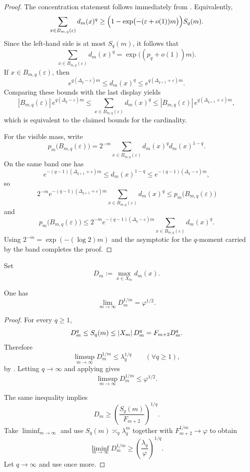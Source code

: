 \begin{proof}
The concentration statement follows immediately from
.  Equivalently,
\[
  \sum_{x\in B_{m,q}(\varepsilon)} d_m(x)^q
  \ge
  \Bigl(1-\exp\bigl(-(\varepsilon+o(1))m\bigr)\Bigr)S_q(m).
\]
Since the left-hand side is at most \(S_q(m)\), it follows that
\[
  \sum_{x\in B_{m,q}(\varepsilon)} d_m(x)^q
  =
  \exp\bigl((p_q+o(1))m\bigr).
\]
If \(x\in B_{m,q}(\varepsilon)\), then
\[
  e^{q(\Delta_q-\varepsilon)m}\le d_m(x)^q\le e^{q(\Delta_{q+1}+\varepsilon)m}.
\]
Comparing these bounds with the last display yields
\[
  |B_{m,q}(\varepsilon)|\,e^{q(\Delta_q-\varepsilon)m}
  \le
  \sum_{x\in B_{m,q}(\varepsilon)} d_m(x)^q
  \le
  |B_{m,q}(\varepsilon)|\,e^{q(\Delta_{q+1}+\varepsilon)m},
\]
which is equivalent to the claimed bounds for the cardinality.

For the visible mass, write
\[
  p_m\bigl(B_{m,q}(\varepsilon)\bigr)
  =
  2^{-m}\sum_{x\in B_{m,q}(\varepsilon)} d_m(x)^q d_m(x)^{1-q}.
\]
On the same band one has
\[
  e^{-(q-1)(\Delta_{q+1}+\varepsilon)m}
  \le
  d_m(x)^{1-q}
  \le
  e^{-(q-1)(\Delta_q-\varepsilon)m},
\]
so
\[
  2^{-m}e^{-(q-1)(\Delta_{q+1}+\varepsilon)m}
  \sum_{x\in B_{m,q}(\varepsilon)} d_m(x)^q
  \le
  p_m\bigl(B_{m,q}(\varepsilon)\bigr)
\]
and
\[
  p_m\bigl(B_{m,q}(\varepsilon)\bigr)
  \le
  2^{-m}e^{-(q-1)(\Delta_q-\varepsilon)m}
  \sum_{x\in B_{m,q}(\varepsilon)} d_m(x)^q.
\]
Using \(2^{-m}=\exp(-(\log 2)m)\) and the asymptotic for the
\(q\)-moment carried by the band completes the proof.
\end{proof}

\begin{definition}
\label{def:max-fiber}
Set
\[
  D_m:=\max_{x\in X_m} d_m(x).
\]
\end{definition}

\begin{theorem}
\label{thm:max-fiber}
One has
\[
  \lim_{m\to\infty} D_m^{1/m}=\varphi^{1/2}.
\]
\end{theorem}

\begin{proof}
For every \(q\ge 1\),
\[
  D_m^q\le S_q(m)\le \lvert X_m \rvert\,D_m^q=F_{m+2}D_m^q.
\]
Therefore
\[
  \limsup_{m\to\infty} D_m^{1/m}\le \lambda_q^{1/q}
  \qquad (\forall q\ge 1),
\]
by .  Letting \(q\to\infty\) and applying
 gives
\[
  \limsup_{m\to\infty} D_m^{1/m}\le \varphi^{1/2}.
\]

The same inequality implies
\[
  D_m\ge \left(\frac{S_q(m)}{F_{m+2}}\right)^{1/q}.
\]
Take \(\liminf_{m\to\infty}\) and use \(S_q(m)\asymp_q \lambda_q^m\) together
with \(F_{m+2}^{1/m}\to\varphi\) to obtain
\[
  \liminf_{m\to\infty} D_m^{1/m}\ge \left(\frac{\lambda_q}{\varphi}\right)^{1/q}.
\]
Let \(q\to\infty\) and use  once more.
\end{proof}

